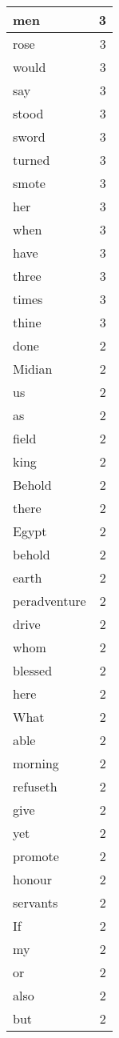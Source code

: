 \begin{center}
\begin{longtable}{l|r}
men & 3\\ \hline 
rose & 3\\ \hline 
would & 3\\ \hline 
say & 3\\ \hline 
stood & 3\\ \hline 
sword & 3\\ \hline 
turned & 3\\ \hline 
smote & 3\\ \hline 
her & 3\\ \hline 
when & 3\\ \hline 
have & 3\\ \hline 
three & 3\\ \hline 
times & 3\\ \hline 
thine & 3\\ \hline 
done & 2\\ \hline 
Midian & 2\\ \hline 
us & 2\\ \hline 
as & 2\\ \hline 
field & 2\\ \hline 
king & 2\\ \hline 
Behold & 2\\ \hline 
there & 2\\ \hline 
Egypt & 2\\ \hline 
behold & 2\\ \hline 
earth & 2\\ \hline 
peradventure & 2\\ \hline 
drive & 2\\ \hline 
whom & 2\\ \hline 
blessed & 2\\ \hline 
here & 2\\ \hline 
What & 2\\ \hline 
able & 2\\ \hline 
morning & 2\\ \hline 
refuseth & 2\\ \hline 
give & 2\\ \hline 
yet & 2\\ \hline 
promote & 2\\ \hline 
honour & 2\\ \hline 
servants & 2\\ \hline 
If & 2\\ \hline 
my & 2\\ \hline 
or & 2\\ \hline 
also & 2\\ \hline 
but & 2\\ \hline 

\end{longtable}
\end{center}
